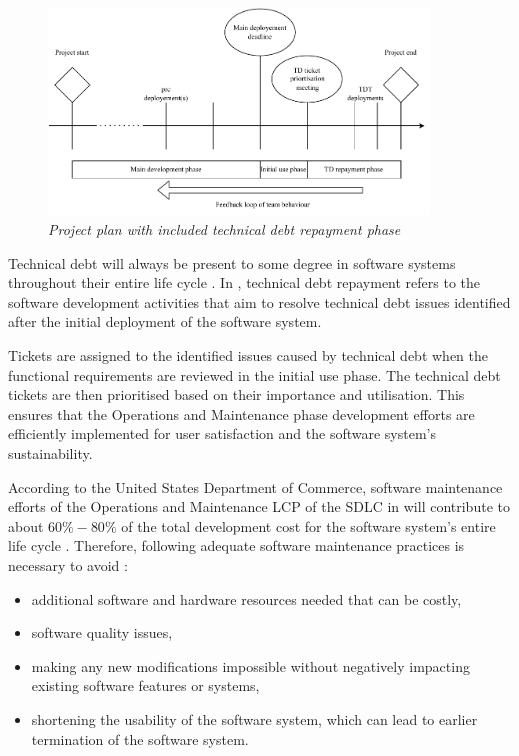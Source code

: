 \clearpage

\begin{figure}[!htb]
	\centering %
	\includegraphics[width=0.9\textwidth]{img/Chapter1/TD_repayment/TD_repayment.pdf}
	\caption[Project plan with included technical debt repayment phase]
	{\textit{Project plan with included technical debt repayment phase \cite{Wiese2021}}}\label{fig:ch1_tdRepayment}
\end{figure} 

Technical debt will always be present to some degree in software systems throughout their entire life cycle \cite{Wiese2021}. In , technical debt repayment refers to the software development activities that aim to resolve technical debt issues identified after the initial deployment of the software system.\par Tickets are assigned to the identified issues caused by technical debt when the functional requirements are reviewed in the initial use phase. The technical debt tickets are then prioritised based on their importance and utilisation. This ensures that the Operations and Maintenance phase development efforts are efficiently implemented for user satisfaction and the software system's sustainability.\par According to the United States Department of Commerce, software maintenance efforts of the Operations and Maintenance LCP of the SDLC in  will contribute to about $60\%-80\%$ of the total development cost for the software system's entire life cycle \cite{Ogheneovo2014, Ackermann2009, Tang2010}. Therefore, following adequate software maintenance practices is necessary to avoid \cite{DeLeon-Sigg2020}:

\begin{itemize}
	\item additional software and hardware resources needed that can be costly,
	\item software quality issues,
	\item making any new modifications impossible without negatively impacting existing software features or systems,
	\item shortening the usability of the software system, which can lead to earlier termination of the software system.
\end{itemize}

